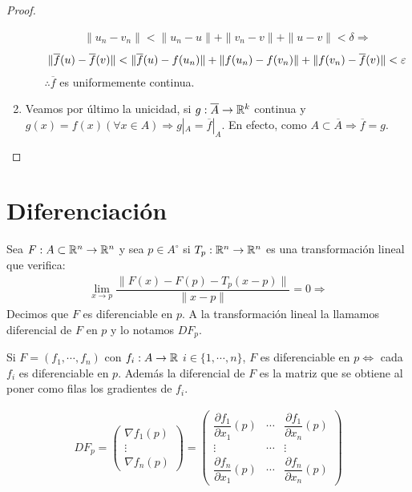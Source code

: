 \begin{theorem}
\begin{proof}
\begin{enumerate}
\begin{enumerate}
\begin{align*}
                      \|u_n - v_n\| < \|u_n - u\| + \|v_n - v\| + \|u - v\| < \delta \Rightarrow
                    \end{align*}
                    \begin{align*}
                      \|\overline{f}(u) - \overline{f}(v)\| < \|\overline{f}(u) - f(u_n)\| + \|f(u_n) - f(v_n)\| + \|f(v_n) - \overline{f}(v)\| < \varepsilon
                    \end{align*} $\therefore \overline{f}$ es uniformemente continua.
            \end{enumerate}
      \item Veamos por último la unicidad, si $g: \overline{A} \to \mathbb{R}^k$ continua y $g(x) = f(x) (\forall x \in A) \Rightarrow g|_A = \overline{f}|_A$. En efecto, como $A \subset \overline{A} \Rightarrow \overline{f} = g$.
    \end{enumerate}
  \end{proof}
\end{theorem}

\section{Diferenciación}

\begin{definition}
  Sea $F : A \subset \mathbb{R}^n \to \mathbb{R}^n$ y sea $p \in A^{\circ}$ si $T_p : \mathbb{R}^n \to \mathbb{R}^n$ es una transformación lineal que verifica:
  \begin{align*}
    \lim_{x \to p} \dfrac{\| F(x) - F(p) - T_p(x-p) \|}{\|x-p\|} = 0 \Rightarrow
  \end{align*} Decimos que $F$ es diferenciable en $p$. A la transformación lineal la llamamos diferencial de $F$ en $p$ y lo notamos $DF_p$.
\end{definition}

Si $F = (f_1, \cdots, f_n)$ con $f_i: A \to \mathbb{R}$ $i \in \{1, \cdots, n\}$, $F$ es diferenciable en $p \iff$ cada $f_i$ es diferenciable en $p$.
Además la diferencial de $F$ es la matriz que se obtiene al poner como filas los gradientes de $f_i$.

\begin{align*}
  DF_p = \begin{pmatrix}
    \nabla f_1(p) \\
    \vdots        \\
    \nabla f_n(p)
  \end{pmatrix} = \begin{pmatrix}
    \dfrac{\partial f_1}{\partial x_1}(p) & \cdots & \dfrac{\partial f_1}{\partial x_n}(p) \\
    \vdots                                & \cdots & \vdots                                \\
    \dfrac{\partial f_n}{\partial x_1}(p) & \cdots & \dfrac{\partial f_n}{\partial x_n}(p)
  \end{pmatrix}
\end{align*}

